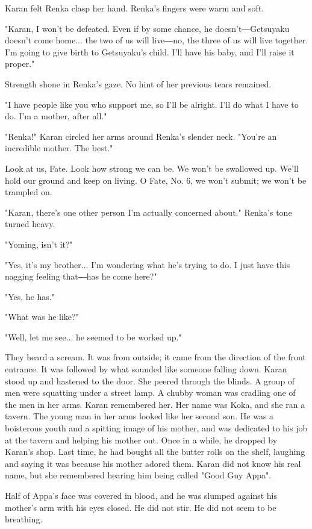 Karan felt Renka clasp her hand. Renka's fingers were warm and soft.

"Karan, I won't be defeated. Even if by some chance, he
doesn't―Getsuyaku doesn't come home... the two of us will live―no, the
three of us will live together. I'm going to give birth to Getsuyaku's
child. I'll have his baby, and I'll raise it proper."

Strength shone in Renka's gaze. No hint of her previous tears remained.

"I have people like you who support me, so I'll be alright. I'll do what
I have to do. I'm a mother, after all."

"Renka!" Karan circled her arms around Renka's slender neck. "You're an
incredible mother. The best."

Look at us, Fate. Look how strong we can be. We won't be swallowed up.
We'll hold our ground and keep on living. O Fate, No. 6, we won't
submit; we won't be trampled on.

"Karan, there's one other person I'm actually concerned about." Renka's
tone turned heavy.

"Yoming, isn't it?"

"Yes, it's my brother... I'm wondering what he's trying to do. I just
have this nagging feeling that―has he come here?"

"Yes, he has."

"What was he like?"

"Well, let me see... he seemed to be worked up."

They heard a scream. It was from outside; it came from the direction of
the front entrance. It was followed by what sounded like someone falling
down. Karan stood up and hastened to the door. She peered through the
blinds. A group of men were squatting under a street lamp. A chubby
woman was cradling one of the men in her arms. Karan remembered her. Her
name was Koka, and she ran a tavern. The young man in her arms looked
like her second son. He was a boisterous youth and a spitting image of
his mother, and was dedicated to his job at the tavern and helping his
mother out. Once in a while, he dropped by Karan's shop. Last time, he
had bought all the butter rolls on the shelf, laughing and saying it was
because his mother adored them. Karan did not know his real name, but
she remembered hearing him being called "Good Guy Appa".

Half of Appa's face was covered in blood, and he was slumped against his
mother's arm with his eyes closed. He did not stir. He did not seem to
be breathing.

